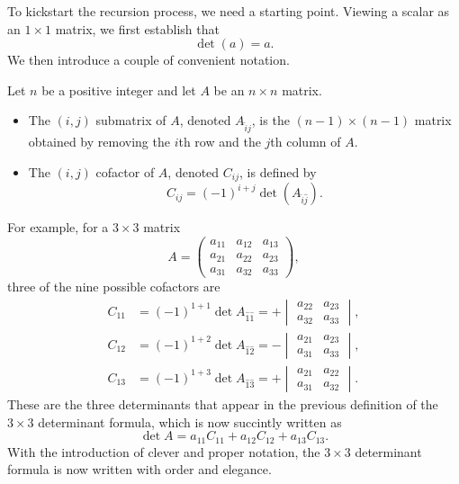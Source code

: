 \documentclass{ximera}
\begin{document}
To kickstart the recursion process, we need a starting point. Viewing
a scalar as an $1 \times 1$ matrix, we first establish that
\[
  \det \left( a \right) = a.
\]
We then introduce a couple of convenient notation.

\begin{definition}
  Let $n$ be a positive integer and let $A$ be an $n \times n$
  matrix.
  \begin{itemize}
  \item The $(i,j)$ submatrix of $A$, denoted $A_{\hat{i}\hat{j}}$, is the $(n-1) \times
    (n-1)$ matrix obtained by removing the $i$th row and the $j$th
    column of $A$.
  \item The $(i,j)$ cofactor of $A$, denoted $C_{ij}$, is defined by
    \[
      C_{ij} = (-1)^{i+j} \det(A_{\hat{i}\hat{j}}).
    \]
  \end{itemize}
\end{definition}

For example, for a $3 \times 3$ matrix
\[
  A =
  \begin{pmatrix}
    a_{11} & a_{12} & a_{13} \\
    a_{21} & a_{22} & a_{23} \\
    a_{31} & a_{32} & a_{33}
  \end{pmatrix},
\]
three of the nine possible cofactors are
\begin{align*}
  C_{11}
  & = (-1)^{1+1} \det A_{\hat{1}\hat{1}}
    = +
    \begin{vmatrix}
      a_{22} & a_{23} \\ a_{32} & a_{33}
    \end{vmatrix}, \\
  C_{12}
  & = (-1)^{1+2} \det A_{\hat{1}\hat{2}}
    = -
    \begin{vmatrix}
      a_{21} & a_{23} \\ a_{31} & a_{33}
    \end{vmatrix}, \\
  C_{13}
  & = (-1)^{1+3} \det A_{\hat{1}\hat{3}}
    = +
    \begin{vmatrix}
      a_{21} & a_{22} \\ a_{31} & a_{32}
    \end{vmatrix}.
\end{align*}
These are the three determinants that appear in the previous
definition of the $3 \times 3$ determinant formula, which is now succintly
written as
\[
  \det A = a_{11} C_{11} + a_{12} C_{12} + a_{13} C_{13}.
\]
With the introduction of clever and proper notation, the $3 \times 3$
determinant formula is now written with order and elegance.
\end{document}
